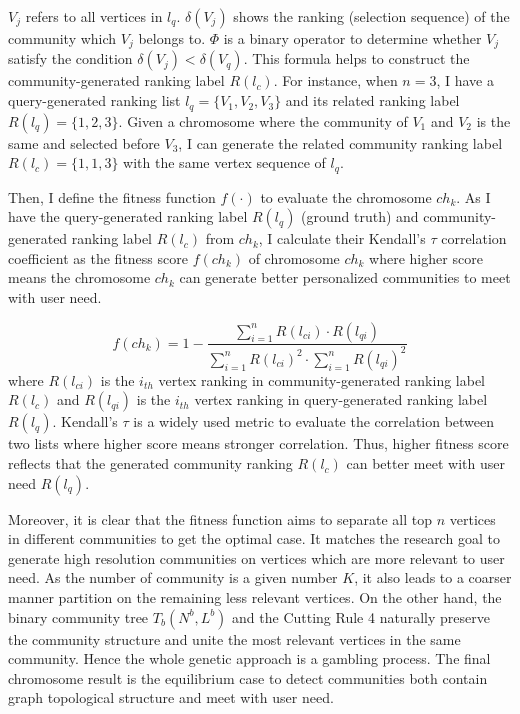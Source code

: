 $V_{j}$ refers to all vertices in $l_{q}$. $\delta(V_{j})$ shows the ranking (selection sequence) of the community which $V_{j}$ belongs to. $\Phi$ is a binary operator to determine whether $V_{j}$ satisfy the condition $\delta(V_{j}) < \delta(V_{q})$. This formula helps to construct the community-generated ranking label $R(l_c)$. For instance, when $n=3$, I have a query-generated ranking list $l_q = \{V_1,V_2,V_3\}$ and its related ranking label $R(l_q) = \{1,2,3\}$. Given a chromosome where the community of $V_1$ and $V_2$ is the same and selected before $V_3$, I can generate the related community ranking label $R(l_c) = \{1,1,3\}$ with the same vertex sequence of $l_q$.

Then, I define the fitness function $f(\cdot)$ to evaluate the chromosome $ch_{k}$. As I have the query-generated ranking label $R(l_{q})$ (ground truth) and community-generated ranking label $R(l_{c})$ from $ch_{k}$, I calculate their Kendall's $\tau$  correlation coefficient  as the fitness score $f(ch_k)$ of chromosome $ch_k$ where higher score means the chromosome $ch_{k}$ can  generate better personalized communities to meet with user need. 

\begin{equation}
\textit{$f(ch_{k})$} = 1-\frac{\sum_{i=1}^{n} R(l_{ci})\cdot R(l_{qi})}{\sum_{i=1}^{n} R(l_{ci})^2\cdot \sum_{i=1}^{n}R(l_{qi})^2}
\end{equation} 
where $R(l_{ci})$ is the $i_{th}$ vertex ranking in community-generated ranking label $R(l_{c})$ and $R(l_{qi})$ is the $i_{th}$ vertex ranking in query-generated ranking label $R(l_{q})$. Kendall's $\tau$ is a widely used metric to evaluate the correlation between two lists where higher score means stronger correlation. Thus, higher fitness score reflects that the generated community ranking $R(l_{c})$ can better meet with user need $R(l_{q})$. 

Moreover, it is clear that the fitness function aims to separate all top $n$ vertices in different communities to get the optimal case. It matches the research goal to generate high resolution communities on vertices which are more relevant to user need. As the number of community is a given number $K$, it also leads to a coarser manner partition on the remaining less relevant vertices. On the other hand, the binary community tree $T_{b}(N^{b},L^{b})$ and the Cutting Rule 4 naturally preserve the community structure and unite the most relevant vertices in the same community. Hence the whole genetic approach is a gambling process. The final chromosome result is the equilibrium case to detect communities both contain graph topological structure and meet with user need.


